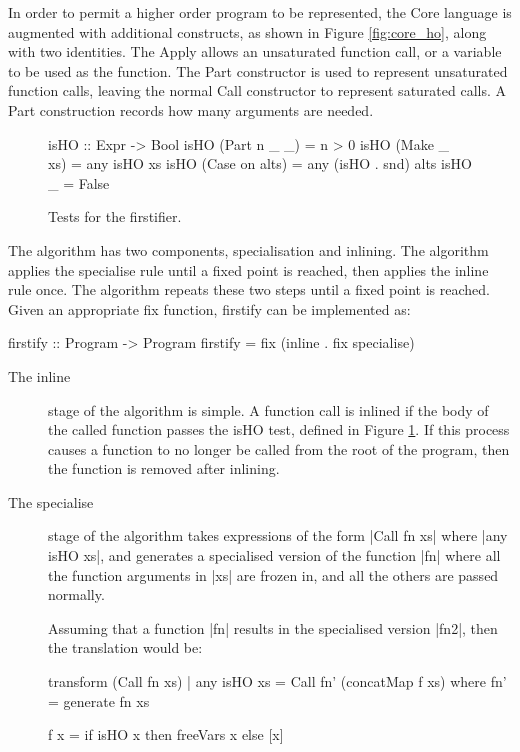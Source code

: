 \documentclass[preprint]{sigplanconf}
\newcommand{\C}[1]{\textsf{#1}}
\begin{document}
In order to permit a higher order program to be represented, the Core language is augmented with additional constructs, as shown in Figure \ref{fig:core_ho}, along with two identities. The \C{Apply} allows an unsaturated function call, or a variable to be used as the function. The \C{Part} constructor is used to represent unsaturated function calls, leaving the normal \C{Call} constructor to represent saturated calls. A \C{Part} construction records how many arguments are needed.

\begin{figure}
\begin{code}
isHO :: Expr -> Bool
isHO (Part n _ _)    = n > 0
isHO (Make _ xs)     = any isHO xs
isHO (Case on alts)  = any (isHO . snd) alts
isHO _               = False
\end{code}
\caption{Tests for the firstifier.}
\label{fig:isHO}
\end{figure}

The algorithm has two components, specialisation and inlining. The algorithm applies the specialise rule until a fixed point is reached, then applies the inline rule once. The algorithm repeats these two steps until a fixed point is reached. Given an appropriate \C{fix} function, \C{firstify} can be implemented as:

\begin{code}
firstify :: Program -> Program
firstify = fix (inline . fix specialise)
\end{code}

\begin{description}
\item[The \C{inline}] stage of the algorithm is simple. A function call is inlined if the body of the called function passes the \C{isHO} test, defined in Figure \ref{fig:isHO}. If this process causes a function to no longer be called from the root of the program, then the function is removed after inlining.

\item[The \C{specialise}] stage of the algorithm takes expressions of the form |Call fn xs| where |any isHO xs|, and generates a specialised version of the function |fn| where all the function arguments in |xs| are frozen in, and all the others are passed normally.

    Assuming that a function |fn| results in the specialised version |fn2|, then the translation would be:

    \begin{code}
    transform (Call fn xs) | any isHO xs =
        Call fn' (concatMap f xs)
        where
        fn' = generate fn xs

        f x = if isHO x then freeVars x else [x]
    \end{code}
\end{description}
\end{document}

